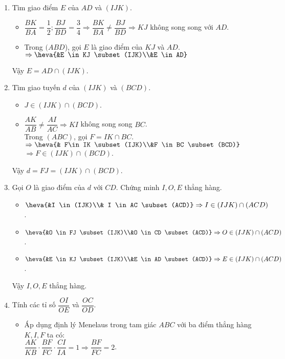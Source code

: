 \begin{bt}
{		\begin{enumerate}
			\item Tìm giao điểm $E$ của $AD$ và $(IJK)$.
			\begin{itemize}
				\item $\dfrac{BK}{BA}=\dfrac{1}{2}; \dfrac{BJ}{BD}=\dfrac{3}{4} \Rightarrow \dfrac{BK}{BA}\neq \dfrac{BJ}{BD} \Rightarrow KJ$ không song song với $AD$.
				\item 	Trong $(ABD$), gọi $E$ là giao điểm của $KJ$ và $AD$.\\
				$\Rightarrow \heva{&E \in KJ \subset (IJK)\\&E \in AD}$
			\end{itemize}
			Vậy $E =AD \cap (IJK)$.
			\item Tìm giao tuyến $d$ của $(IJK)$ và $(BCD)$.
			\begin{itemize}
				\item  $ J \in (IJK) \cap (BCD)$.
				\item 	$\dfrac{AK}{AB} \neq \dfrac{AI}{AC} \Rightarrow KI$ không song song $BC$.\\
				Trong $(ABC)$, gọi $F=IK \cap BC$.\\
				$ \Rightarrow \heva{& F\in IK \subset (IJK)\\&F \in BC \subset (BCD)}	$\\
				$\Rightarrow F \in (IJK) \cap (BCD)$.
			\end{itemize}
			Vậy $ d = FJ =(IJK) \cap (BCD)$.
			\item Gọi $O$ là giao điểm của $d$ với $CD$. Chứng minh $I, O, E$ thẳng hàng.
			\begin{itemize}
				\item  $ \heva{&I \in (IJK)\\& I \in AC \subset (ACD)} \Rightarrow I \in (IJK) \cap (ACD)$.
				\item 	$\heva{&O \in FJ \subset (IJK)\\&O \in CD \subset (ACD)} \Rightarrow O \in (IJK) \cap (ACD)$.
				\item $\heva{&E \in KJ \subset (IJK)\\&E \in AD \subset (ACD)} \Rightarrow E \in (IJK) \cap (ACD)$.
			\end{itemize}
			Vậy $I, O, E$ thẳng hàng.
			\item Tính các tỉ số $\dfrac{OI}{OE}$ và $\dfrac{OC}{OD}$.
			\begin{itemize}
				\item Áp dụng định lý Menelaus trong tam giác $ABC$ với ba điểm thẳng hàng $K, I, F$ ta có$\colon$\\ $\dfrac{AK}{KB}\cdot \dfrac{BF}{FC}\cdot \dfrac{CI}{IA}=1 \Rightarrow \dfrac{BF}{FC}=2$.\\

\end{itemize}
\end{enumerate}}
\end{bt}
